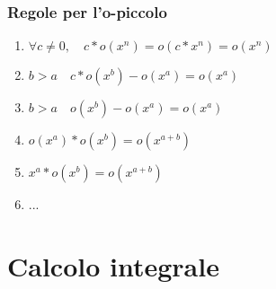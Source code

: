 \documentclass{article}
\begin{document}
        \subsubsection{Regole per l'o-piccolo}
        \begin{enumerate}
          \item $\forall c \neq 0,\quad  c*o(x^n)=o(c*x^n)=o(x^n)$
          \item $b>a \quad c*o(x^b)-o(x^a)=o(x^a)$
          \item $b>a \quad o(x^b)-o(x^a)=o(x^a)$
          \item $o(x^a)*o(x^b)=o(x^{a+b})$
          \item $x^a*o(x^b)=o(x^{a+b})$
          \item ...
        \end{enumerate}
        \section{Calcolo integrale}
        \begin{flushleft}
          
        \end{flushleft}
\end{document}
